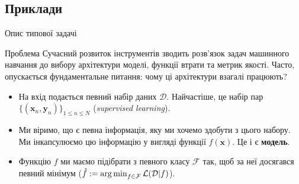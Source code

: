 \documentclass{zkdl-presentation-template}
\begin{document}



    \subsection{Приклади}
    \begin{frame}{Опис типової задачі}
        \begin{alertblock}{Проблема}
            Сучасний розвиток інструментів зводить розв'язок задач машинного
            навчання до вибору архітектури моделі, функції втрати та метрик
            якості. Часто, опускається фундаментальне питання: чому ці
            архітектури взагалі працюють?
        \end{alertblock}

        \begin{itemize}
            \item На вхід подається певний набір даних $\mathcal{D}$.
            Найчастіше, це набір пар $\{(\boldsymbol{x}_n,\boldsymbol{y}_n)\}_{1
            \leq n \leq N}$ (\textit{supervised learning}).
            \item Ми віримо, що є певна інформація, яку ми хочемо здобути з цього набору. Ми інкапсулюємо цю інформацію у вигляді функції $f(\boldsymbol{x})$. Це і є \textbf{модель}.
            \item Функцію $f$ ми маємо підібрати з певного класу $\mathcal{F}$ так, щоб за неї досягався певний мінімум ($\hat{f} := \operatorname*{arg\,min}_{f \in \mathcal{F}}\mathcal{L}(\mathcal{D}|f)$).
        \end{itemize}
    \end{frame}
\end{document}
